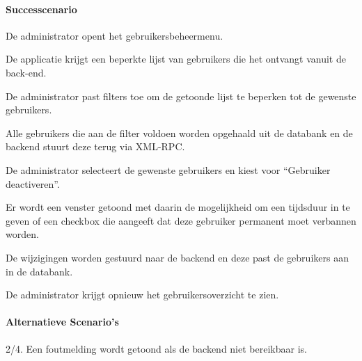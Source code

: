 \begin{compact}
\paragraph{Successcenario}
\begin{enumerate_compact}
 \item De administrator opent het gebruikersbeheermenu.
 \item De applicatie krijgt een beperkte lijst van gebruikers die het ontvangt vanuit de back-end.
 \item De administrator past filters toe om de getoonde lijst te beperken tot de gewenste gebruikers.
 \item Alle gebruikers die aan de filter voldoen worden opgehaald uit de databank en de backend stuurt deze terug via XML-RPC.
 \item De administrator selecteert de gewenste gebruikers en kiest voor ``Gebruiker deactiveren''.
 \item Er wordt een venster getoond met daarin de mogelijkheid om een tijdsduur in te geven of een checkbox die aangeeft dat deze gebruiker permanent moet verbannen worden.
 \item De wijzigingen worden gestuurd naar de backend en deze past de gebruikers aan in de databank.
 \item De administrator krijgt opnieuw het gebruikersoverzicht te zien.
\end{enumerate_compact}
\paragraph{Alternatieve Scenario's}
\begin{enumerate_compact}
	\item[2/4.] Een foutmelding wordt getoond als de backend niet bereikbaar is.
\end{enumerate_compact}
\end{compact}

